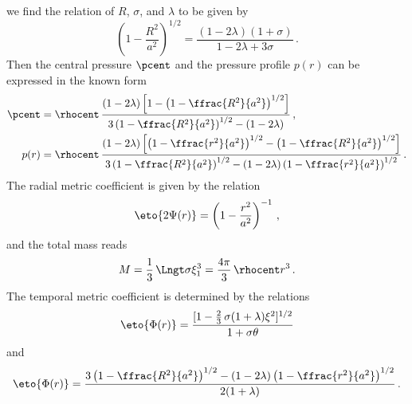 we find the relation of $R$, $\sigma$, and $\lambda$ to be given by
\begin{equation}
  \left(1-\frac{R^{2}}{a^{2}}\right)^{\!\!1/2}
  = \frac{(1-2\lambda)(1+\sigma)}{1-2\lambda+3\sigma}\,.      \label{Eq:grp93}
\end{equation}
Then the central pressure $\pcent$ and the pressure profile $p(r)$ can
be expressed in the known
form~\cite{Stu:2000:ACTPS2:,%
  Boh:2004:GENRG2:11Solutions,%
  Boh-Fod:2008:PHYSR4:PerFluidCC}
\begin{align}
  \pcent &= \rhocent\,\frac%
    {(1-2\lambda)\left[1-\left(1-\ffrac{R^{2}}{a^{2}}\right)^{1/2}\right]}%
    {3\left(1-\ffrac{R^{2}}{a^{2}}\right)^{1/2}
      -(1-2\lambda)}\,,                                    \label{Eq:grp94}\\
  p(r) &= \rhocent\,\frac%
    {(1-2\lambda)
      \left[
        \left(1-\ffrac{r^{2}}{a^{2}}\right)^{1/2}
        -\left(1-\ffrac{R^{2}}{a^{2}}\right)^{1/2}
      \right]}%
    {3\left(1-\ffrac{R^{2}}{a^{2}}\right)^{1/2}
      -(1-2\lambda)
      \left(1-\ffrac{r^{2}}{a^{2}}\right)^{1/2}}\,.        \label{Eq:grp95}
\end{align}
The radial metric coefficient is given by the relation
\begin{equation}
  \eto{2\Psi(r)}
    = \left(1-\frac{r^{2}}{a^{2}}\right)^{-1}\,,           \label{Eq:grp96}
\end{equation}
and the total mass reads 
\begin{equation}
  M = \frac{1}{3}\,\Lngt\sigma\xi_{1}^{3}
    = \frac{4\pi}{3}\,\rhocent r^{3}\,. \label{Eq:grp97}
\end{equation}
The temporal metric coefficient is determined by the relations  
\begin{equation}
  \eto{\Phi(r)} = \frac{[1 - \frac{2}{3}\,\sigma(1+\lambda)\xi^{2}]^{1/2}}%
                  {1 + \sigma\theta}                       \label{Eq:grp99}
\end{equation}
and
\begin{equation}
  \eto{\Phi(r)} = \frac%
    {3\left(1-\ffrac{R^{2}}{a^{2}}\right)^{1/2}
      -(1-2\lambda)\left(1-\ffrac{r^{2}}{a^{2}}\right)^{1/2}}%
    {2(1+\lambda)}\,.                                      \label{Eq:grp98}
\end{equation}


